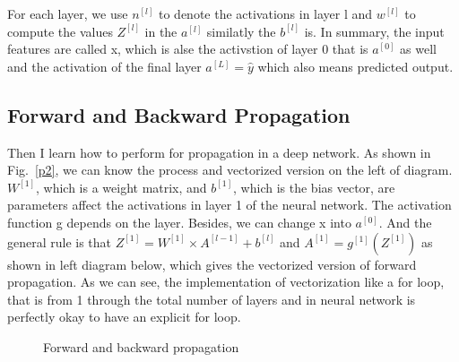 \documentclass[a4paper]{article}
\begin{document}
For each layer, we use $n^{[l]}$ to denote the activations in layer l and $w^{[l]}$ to compute the values $Z^{[l]}$ in the $a^{[l]}$ similatly the $b^{[l]}$ is. In summary, the input features are called x, which is alse the activstion of layer 0 that is $a^{[0]}$ as well and the activation of the final layer $a^{[L]} = \hat{y}$ which also means predicted output.


\subsection{Forward and Backward Propagation}

Then I learn how to perform for propagation in a deep network. As shown in Fig.~\ref{p2}, we can know the process and vectorized version on the left of diagram. $W^{[1]}$, which is a weight matrix, and $b^{[1]}$, which is the bias vector, are parameters affect the activations in layer 1 of the neural network. The activation function g depends on the layer. Besides, we can change x into $a^{[0]}$. And the general rule is that $Z^{[1]} = W^{[1]}\times A^{[l-1]}+b^{[l]}$ and $A^{[1]} = g^{[1]}(Z^{[1]})$ as shown in left diagram below, which gives the vectorized version of forward propagation. As we can see, the implementation of vectorization like a for loop, that is from 1 through the total number of layers and in neural network is perfectly okay to have an explicit for loop.
\begin{figure}
	\centering 
	\caption{Forward and backward propagation} 
	\label{p3} %
\end{figure} 
\end{document}
